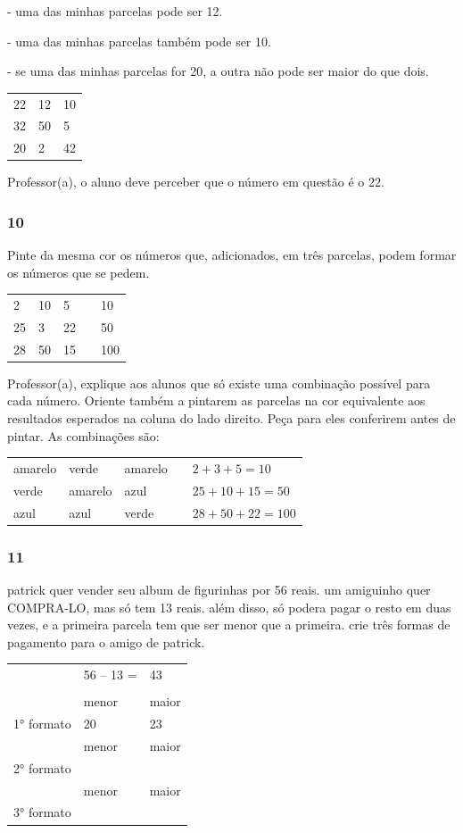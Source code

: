 - uma das minhas parcelas pode ser 12.

- uma das minhas parcelas também pode ser 10.

- se uma das minhas parcelas for 20, a outra não pode ser maior do que
dois.

\begin{longtable}[]{@{}lll@{}}
\toprule
22 & 12 & 10\tabularnewline
32 & 50 & 5\tabularnewline
20 & 2 & 42\tabularnewline
\bottomrule
\end{longtable}

Professor(a), o aluno deve perceber que o número em questão é o 22.

\subsubsection{10}\label{section-17}

Pinte da mesma cor os números que, adicionados, em três parcelas, podem
formar os números que se pedem.

\begin{longtable}[]{@{}lllll@{}}
\toprule
2 & 10 & 5 & & 10\tabularnewline
25 & 3 & 22 & & 50\tabularnewline
28 & 50 & 15 & & 100\tabularnewline
\bottomrule
\end{longtable}

Professor(a), explique aos alunos que só existe uma combinação possível
para cada número. Oriente também a pintarem as parcelas na cor
equivalente aos resultados esperados na coluna do lado direito. Peça
para eles conferirem antes de pintar. As combinações são:

\begin{longtable}[]{@{}lllll@{}}
\toprule
amarelo & verde & amarelo & & \(2 + 3 + 5 = 10\)\tabularnewline
verde & amarelo & azul & & \(25 + 10 + 15 = 50\)\tabularnewline
azul & azul & verde & & \(28 + 50 + 22 = 100\)\tabularnewline
\bottomrule
\end{longtable}

\subsubsection{11}\label{section-18}

patrick quer vender seu album de figurinhas por 56 reais. um amiguinho
quer COMPRA-LO, mas só tem 13 reais. além disso, só podera pagar o resto
em duas vezes, e a primeira parcela tem que ser menor que a primeira.
crie três formas de pagamento para o amigo de patrick.

\begin{longtable}[]{@{}lll@{}}
\toprule
& 56 -- 13 = & 43\tabularnewline
& &\tabularnewline
& menor & maior\tabularnewline
1° formato & 20 & 23\tabularnewline
& menor & maior\tabularnewline
2° formato & &\tabularnewline
& menor & maior\tabularnewline
3° formato & &\tabularnewline
\bottomrule
\end{longtable}


